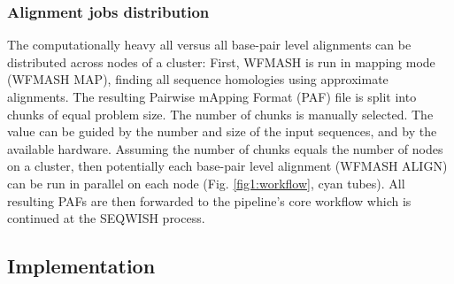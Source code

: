 \documentclass{bioinfo}
\theoremstyle{definition}
\begin{document}
	\subsubsection{Alignment jobs distribution}
	
	The computationally heavy all versus all base-pair level alignments can be distributed across nodes of a cluster: 
	First, WFMASH is run in mapping mode (WFMASH MAP), finding all sequence homologies using approximate alignments. 
	The resulting Pairwise mApping Format (PAF) file is split into chunks of equal problem size. 
	The number of chunks is manually selected. 
	The value can be guided by the number and size of the input sequences, and by the available hardware. 
	Assuming the number of chunks equals the number of nodes on a cluster, then potentially each base-pair level alignment (WFMASH ALIGN) can be run in parallel on each node  (Fig. \ref{fig1:workflow}, cyan tubes). 
	All resulting PAFs are then forwarded to the pipeline’s core workflow which is continued at the SEQWISH process.
	
	\subsection{Implementation}
	
\end{document}
